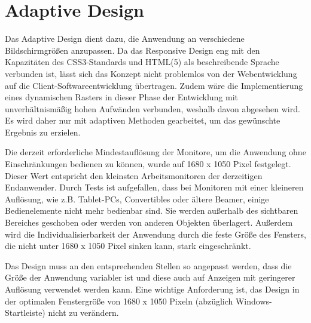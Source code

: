 \chapter{Adaptive Design}
Das Adaptive Design dient dazu, die Anwendung an verschiedene Bildschirmgrößen anzupassen. Da das Responsive Design eng mit den Kapazitäten des CSS3-Standards und HTML(5) als beschreibende Sprache verbunden ist, lässt sich das Konzept nicht problemlos von der Webentwicklung auf die Client-Softwareentwicklung übertragen. Zudem wäre die Implementierung eines dynamischen Rasters in dieser Phase der Entwicklung mit unverhältnismäßig hohen Aufwänden verbunden, weshalb davon abgesehen wird. Es wird daher nur mit adaptiven Methoden gearbeitet, um das gewünschte Ergebnis zu erzielen.\par
Die derzeit erforderliche Mindestauflösung der Monitore, um die Anwendung ohne Einschränkungen bedienen zu können, wurde auf 1680 x 1050 Pixel festgelegt. Dieser Wert entspricht den kleinsten Arbeitsmonitoren der derzeitigen Endanwender. Durch Tests ist aufgefallen, dass bei Monitoren mit einer kleineren Auflösung, wie z.B. Tablet-PCs, Convertibles oder ältere Beamer, einige Bedienelemente nicht mehr bedienbar sind. Sie werden außerhalb des sichtbaren Bereiches geschoben oder werden von anderen Objekten überlagert. Außerdem wird die Individualisierbarkeit der Anwendung durch die feste Größe des Fensters, die nicht unter 1680 x 1050 Pixel sinken kann, stark eingeschränkt.\par
Das Design muss an den entsprechenden Stellen so angepasst werden, dass die Größe der Anwendung variabler ist und diese auch auf Anzeigen mit geringerer Auflösung verwendet werden kann. Eine wichtige Anforderung ist, das Design in der optimalen Fenstergröße von 1680 x 1050 Pixeln (abzüglich Windows- Startleiste) nicht zu verändern.\par
